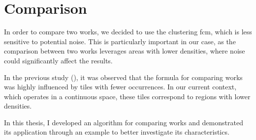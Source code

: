 \newpage
\section{Comparison}
\begin{modified}
In order to compare two works, we decided to use the clustering \gls{fcm}, which is less sensitive to potential noise. This is particularly important in our case, as the comparison between two works leverages areas with lower densities, where noise could significantly affect the results.

\noindent In the previous study (\cite{thesis}), it was observed that the formula for comparing works was highly influenced by tiles with fewer occurrences. In our current context, which operates in a continuous space, these tiles correspond to regions with lower densities.

\noindent In this thesis, I developed an algorithm for comparing works and demonstrated its application through an example to better investigate its characteristics.
\end{modified}


